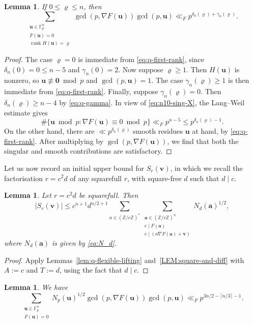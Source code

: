 \documentclass[a4paper,11pt, twoside,reqno]{amsart}
\theoremstyle{plain}
\newtheorem{lemma}[thm]{Lemma}
\theoremstyle{definition}
\theoremstyle{remark}
\newcommand{\F}{\mathbb{F}}
\newcommand{\ZZ}{\mathbb{Z}}
\DeclareMathOperator{\rank}{rank}
\renewcommand{\le}{\leqslant}
\renewcommand{\leq}{\leqslant}
\renewcommand{\ge}{\geqslant}
\newcommand{\FF}{\mathbb{F}}
\numberwithin{equation}{section}
\begin{document}
\begin{lemma}
\label{LEM:weighted-rank-locus}
If $0\le \varrho\le n$, then
$$\sum_{\substack{\bm u\in\FF_p^n\\F(\bm u)=0\\
\rank H(\bm u) = \varrho}}
\gcd(p,\nabla F(\bm u))\gcd(p,\bm u)
\ll_F p^{\delta_n(\varrho) + \gamma_n(\varrho)}.$$
\end{lemma}

\begin{proof}
The case $\varrho=0$ is immediate from \eqref{eq:q-first-rank},
since $\delta_n(0)=0 \le n-5$ and $\gamma_n(0)=2$.
Now suppose $\varrho\ge 1$.
Then $H(\bm u)$ is nonzero, so $\bm u\not\equiv \bm0 \bmod{p}$ and $\gcd(p,\bm u) = 1$.
The case $\gamma_n(\varrho)\ge 1$ is then immediate from \eqref{eq:q-first-rank}.
Finally, suppose $\gamma_n(\varrho)=0$.
Then $\delta_n(\varrho)\ge n-4$ by \eqref{eq:q-gamma}.
In view of \eqref{eq:n10-sing-X}, the Lang--Weil estimate gives
$$\#\{\bm u\bmod{p}: \nabla F(\bm u) \equiv 0\bmod{p}\} \ll_F p^{n-5}
\le p^{\delta_n(\varrho)-1}.$$
On the other hand, there are $\ll p^{\delta_n(\varrho)}$ smooth residues $\bm u$ at hand, by \eqref{eq:q-first-rank}.
After multiplying by $\gcd(p,\nabla F(\bm u))$,
we find that both the singular and smooth contributions are satisfactory.
\end{proof}
	
Let us now record an initial  upper bound for $S_r(\bm{v})$, in which we recall the factorisation $r=c^2d$ of any squarefull $r$, with square-free $d$  such that $d\mid c$.

\begin{lemma}\label{lem:starT}
Let $r=c^2d$ be squarefull. Then 
$$
|S_r(\bm{v})|\leq 
c^{n+1}d^{n/2+1}
\sum_{a\in (\ZZ/c\ZZ)^*} \sum_{
\substack{\bm{a}\in (\ZZ/c\ZZ)^n\\ 
c\mid F(\bm{a})\\
c\mid (a\nabla F(\bm{a})+\bm{v})}} N_d(\bm{a})^{1/2},
$$
where $N_d(\bm{a})$ is given by \eqref{eq:N_d}.
\end{lemma}

\begin{proof}
Apply Lemmas~\ref{lem:q-flexible-lifting} and~\ref{LEM:square-and-diff}
with $A := c$ and $T := d$, using the fact that $d\mid c$.
\end{proof}


\begin{lemma}\label{lem:frog}
We have
\begin{equation}\label{eq:weighted-prime-smith-mass}
\sum_{\substack{\bm u\in\FF_p^n\\F(\bm u)=0}}
N_p(\bm u)^{1/2}
\gcd(p,\nabla F(\bm u))\gcd(p,\bm u)
\ll_F p^{3n/2 - \lceil n/3\rceil - 1}.
\end{equation}
\end{lemma}
\end{document}
